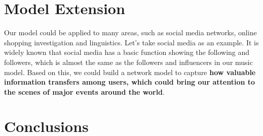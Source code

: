 \documentclass[12pt]{article}
\begin{document}
\section{Model Extension}
Our model could be applied to many areas, such as social media networks, online shopping investigation and linguistics.
Let's take social media as an example. It is widely known that social media has a basic function showing the following and followers, which is almost the same as the followers and influencers in our music model. Based on this, we could build a network model to capture \textbf{how valuable information transfers among users, which could bring our attention to the scenes of major events around the world}.
\section{Conclusions}
\end{document}
